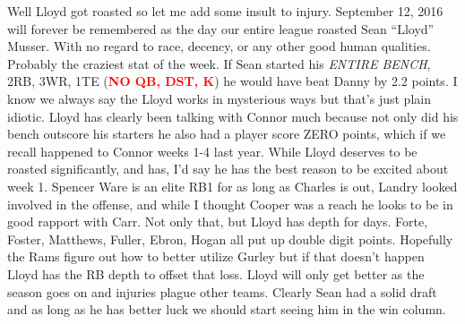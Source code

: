\documentclass[11pt,letterpaper]{article}
\begin{document}
\par\noindent Well Lloyd got roasted so let me add some insult to injury. September 12, 2016 will forever be remembered as the day our entire league roasted Sean ``Lloyd'' Musser. With no regard to race, decency, or any other good human qualities. Probably the craziest stat of the week. If Sean started his \textit{ENTIRE BENCH}, 2RB, 3WR, 1TE (\textcolor{red}{\textbf{NO QB, DST, K}}) he would have beat Danny by 2.2 points. I know we always say the Lloyd works in mysterious ways but that's just plain idiotic. Lloyd has clearly been talking with Connor much because not only did his bench outscore his starters he also had a player score ZERO points, which if we recall happened to Connor weeks 1-4 last year. While Lloyd deserves to be roasted significantly, and has, I'd say he has the best reason to be excited about week 1. Spencer Ware is an elite RB1 for as long as Charles is out, Landry looked involved in the offense, and while I thought Cooper was a reach he looks to be in good rapport with Carr. Not only that, but Lloyd has depth for days. Forte, Foster, Matthews, Fuller, Ebron, Hogan all put up double digit points. Hopefully the Rams figure out how to better utilize Gurley but if that doesn't happen Lloyd has the RB depth to offset that loss. Lloyd will only get better as the season goes on and injuries plague other teams. Clearly Sean had a solid draft and as long as he has better luck we should start seeing him in the win column.
\end{document}
